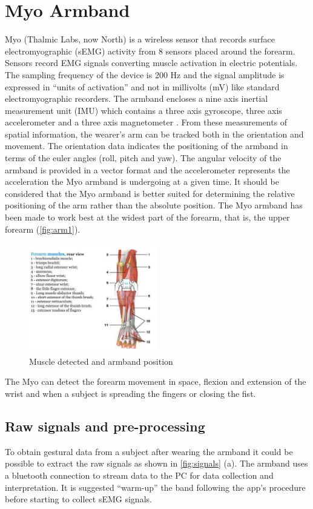 \documentclass{vgtc}
\begin{document}
\section{Myo Armband}\label{sec:myo}
Myo (Thalmic Labs, now North) \cite{northwebsite} is a wireless sensor that records surface electromyographic (sEMG) activity from 8 sensors placed around the forearm. Sensors record EMG signals converting muscle activation in electric potentials. The sampling frequency of the device is 200 Hz and the signal amplitude is expressed in “units of activation” and not in millivolts (mV) like standard electromyographic recorders. The armband encloses a nine axis inertial measurement unit (IMU) which contains a three axis gyroscope, three axis accelerometer and a three axis magnetometer \cite{myowebsite}. From these measurements of spatial information, the wearer’s arm can be tracked both in the orientation and movement. The orientation data indicates the positioning of the armband in terms of the euler angles (roll, pitch and yaw). The angular velocity of the armband is provided in a vector format and the accelerometer represents the acceleration the Myo armband is undergoing at a given time. It should be considered that the Myo armband is better suited for determining the relative positioning of the arm rather than the absolute position. The Myo armband has been made to work best at the widest part of the forearm, that is, the upper forearm (\autoref{fig:arm1}).
\begin{figure}[h]
\includegraphics[width=0.5\textwidth]{myo_armband_muscles}
\caption{Muscle detected and armband position}
\centering
\label{fig:arm1}
\end{figure}
The Myo can detect the forearm movement in space, flexion and extension of the wrist and when a subject is spreading the fingers or closing the fist. 
\subsection{Raw signals and pre-processing}
To obtain gestural data from a subject after wearing the armband it could be possible to extract the raw signals as shown in \autoref{fig:signals} (a). The armband uses a bluetooth connection to stream data to the PC for data collection and interpretation. It is suggested “warm-up” the band following the app's procedure before starting to collect sEMG signals.
\end{document}
